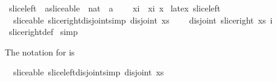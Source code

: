 \begin{isabellebody}
\ slice{\isacharunderscore}left\ {\isacharcolon}{\isacharcolon}\ {\isachardoublequoteopen}{\isacharprime}a{\isacharcolon}{\isacharcolon}sliceable\ {\isasymRightarrow}\ nat\ {\isasymRightarrow}\ {\isacharprime}a{\isachardoublequoteclose}\ {\isacharparenleft}{\isachardoublequoteopen}{\isacharparenleft}{}{\isacharunderscore}{\isasymdagger}{\isacharunderscore}{\isachardot}{\isachardot}{\isacharparenright}{\isachardoublequoteclose}\ {\isacharbrackleft}{}{}{\isacharcomma}{}{}{\isacharbrackright}\ {}{}{\isacharparenright}\isanewline
{}\ {\isachardoublequoteopen}x{\isasymdagger}i{\isachardot}{\isachardot}\ {\isacharequal}\ x{\isasymdagger}i{\isachardot}{\isachardot}{\isacharparenleft}{\isacharhash}\ x{\isacharparenright}{\isachardoublequoteclose}\isanewline
\isanewline
{}\isamarkupfalse%
\ {\isacharparenleft}{\isachardoublequoteopen}latex{\isachardoublequoteclose}{\isacharparenright}\ slice{\isacharunderscore}left\ \ {\isacharparenleft}{\isachardoublequoteopen}{\isacharparenleft}{}{\isacharunderscore}\isactrlbsub {\isacharbrackleft}{\isacharunderscore}{\isachardot}{\isachardot}{\isacharbrackright}\isactrlesub {\isacharparenright}{\isachardoublequoteclose}\ {\isacharbrackleft}{}{}{\isacharcomma}{}{}{\isacharbrackright}\ {}{}{\isacharparenright}\isanewline
\isanewline
\isanewline
\isanewline
{}\isamarkupfalse%
\ {\isacharparenleft}\ sliceable{\isacharparenright}\ slice{\isacharunderscore}right{\isacharunderscore}disjoint{\isacharbrackleft}simp{\isacharbrackright}{\isacharcolon}\ {\isachardoublequoteopen}disjoint\ xs\ {\isasymLongrightarrow}\ \isanewline
\ \ disjoint\ {\isacharparenleft}slice{\isacharunderscore}right\ xs\ i{\isacharparenright}{\isachardoublequoteclose}\isanewline
%
\isadelimproof
%
\endisadelimproof
%
\isatagproof
{}\isamarkupfalse%
\ slice{\isacharunderscore}right{\isacharunderscore}def\isanewline
{}\isamarkupfalse%
\ simp%
\endisatagproof
{\isafoldproof}%
%
\isadelimproof
%
\endisadelimproof
%
\begin{isamarkuptext}%
The notation for  is %
\end{isamarkuptext}\isamarkuptrue%
\isamarkupfalse%
\ {\isacharparenleft}\ sliceable{\isacharparenright}\ slice{\isacharunderscore}left{\isacharunderscore}disjoint{\isacharbrackleft}simp{\isacharbrackright}{\isacharcolon}\ {\isachardoublequoteopen}disjoint\ xs\ {\isasymLongrightarrow}\ \isanewline

\end{isabellebody}
